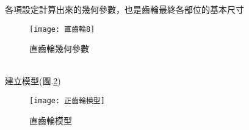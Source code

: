 \begin{itemize}
		各項設定計算出來的幾何參數，也是齒輪最終各部位的基本尺寸\\
		\begin{figure}[hbt!]
		\begin{center}
		\texttt{[image: 直齒輪8]}
		\caption{\Large 直齒輪幾何參數}\label{2.23}
		\end{center}
		\end{figure}
		\\
		建立模型(圖.\ref{2.24})\\
		\begin{figure}[hbt!]
		\begin{center}
		\texttt{[image: 正齒輪模型]}
		\caption{\Large 直齒輪模型}\label{2.24}
		\end{center}
		\end{figure}
		\\
		
\newpage
		

\end{itemize}
